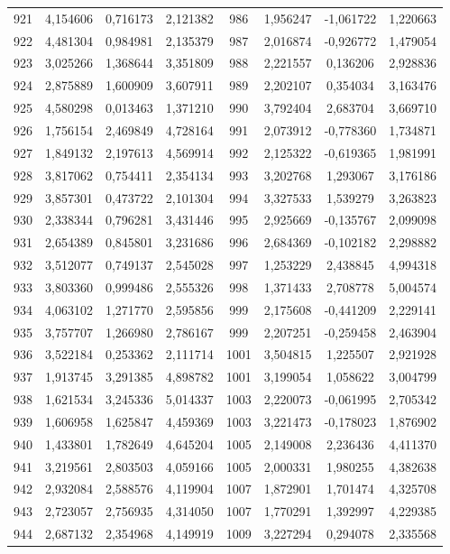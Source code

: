 \begin{apendicesenv}
\begin{table}[H]
\begin{tabular}{c c c c c c c c}
		921 & 4,154606 & 0,716173 & 2,121382 & 986 & 1,956247 & -1,061722 & 1,220663 \\
		922 & 4,481304 & 0,984981 & 2,135379 & 987 & 2,016874 & -0,926772 & 1,479054 \\
		923 & 3,025266 & 1,368644 & 3,351809 & 988 & 2,221557 & 0,136206 & 2,928836 \\
		924 & 2,875889 & 1,600909 & 3,607911 & 989 & 2,202107 & 0,354034 & 3,163476 \\
		925 & 4,580298 & 0,013463 & 1,371210 & 990 & 3,792404 & 2,683704 & 3,669710 \\
		926 & 1,756154 & 2,469849 & 4,728164 & 991 & 2,073912 & -0,778360 & 1,734871 \\
		927 & 1,849132 & 2,197613 & 4,569914 & 992 & 2,125322 & -0,619365 & 1,981991 \\
		928 & 3,817062 & 0,754411 & 2,354134 & 993 & 3,202768 & 1,293067 & 3,176186 \\
		929 & 3,857301 & 0,473722 & 2,101304 & 994 & 3,327533 & 1,539279 & 3,263823 \\
		930 & 2,338344 & 0,796281 & 3,431446 & 995 & 2,925669 & -0,135767 & 2,099098 \\
		931 & 2,654389 & 0,845801 & 3,231686 & 996 & 2,684369 & -0,102182 & 2,298882 \\
		932 & 3,512077 & 0,749137 & 2,545028 & 997 & 1,253229 & 2,438845 & 4,994318 \\
		933 & 3,803360 & 0,999486 & 2,555326 & 998 & 1,371433 & 2,708778 & 5,004574 \\
		934 & 4,063102 & 1,271770 & 2,595856 & 999 & 2,175608 & -0,441209 & 2,229141 \\
		935 & 3,757707 & 1,266980 & 2,786167 & 999 & 2,207251 & -0,259458 & 2,463904 \\
		936 & 3,522184 & 0,253362 & 2,111714 & 1001 & 3,504815 & 1,225507 & 2,921928 \\
		937 & 1,913745 & 3,291385 & 4,898782 & 1001 & 3,199054 & 1,058622 & 3,004799 \\
		938 & 1,621534 & 3,245336 & 5,014337 & 1003 & 2,220073 & -0,061995 & 2,705342 \\
		939 & 1,606958 & 1,625847 & 4,459369 & 1003 & 3,221473 & -0,178023 & 1,876902 \\
		940 & 1,433801 & 1,782649 & 4,645204 & 1005 & 2,149008 & 2,236436 & 4,411370 \\
		941 & 3,219561 & 2,803503 & 4,059166 & 1005 & 2,000331 & 1,980255 & 4,382638 \\
		942 & 2,932084 & 2,588576 & 4,119904 & 1007 & 1,872901 & 1,701474 & 4,325708 \\
		943 & 2,723057 & 2,756935 & 4,314050 & 1007 & 1,770291 & 1,392997 & 4,229385 \\
		944 & 2,687132 & 2,354968 & 4,149919 & 1009 & 3,227294 & 0,294078 & 2,335568 \\
		\bottomrule
	\end{tabular}
\end{table}


\end{apendicesenv}
